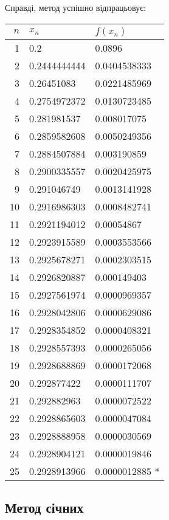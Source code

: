 Справді, метод успішно відпрацьовує:
\begin{table}[H]
    \centering
    \begin{tabular}{|r|l|l|}
        \hline
        $n$ & $x_n$ & $f(x_n)$ \\ \hline
         1 & 0.2          & 0.0896       \\
         2 & 0.2444444444 & 0.0404538333 \\
         3 & 0.26451083   & 0.0221485969 \\
         4 & 0.2754972372 & 0.0130723485 \\
         5 & 0.281981537  & 0.008017075  \\
         6 & 0.2859582608 & 0.0050249356 \\
         7 & 0.2884507884 & 0.003190859  \\
         8 & 0.2900335557 & 0.0020425975 \\
         9 & 0.291046749  & 0.0013141928 \\
        10 & 0.2916986303 & 0.0008482741 \\
        11 & 0.2921194012 & 0.00054867   \\
        12 & 0.2923915589 & 0.0003553566 \\
        13 & 0.2925678271 & 0.0002303515 \\
        14 & 0.2926820887 & 0.000149403  \\
        15 & 0.2927561974 & 0.0000969357 \\
        16 & 0.2928042806 & 0.0000629086 \\
        17 & 0.2928354852 & 0.0000408321 \\
        18 & 0.2928557393 & 0.0000265056 \\
        19 & 0.2928688869 & 0.0000172068 \\
        20 & 0.292877422  & 0.0000111707 \\
        21 & 0.292882963  & 0.0000072522 \\
        22 & 0.2928865603 & 0.0000047084 \\
        23 & 0.2928888958 & 0.0000030569 \\
        24 & 0.2928904121 & 0.0000019846 \\
        25 & 0.2928913966 & 0.0000012885 * \\ \hline
    \end{tabular}
\end{table}

\subsection{Метод січних}

